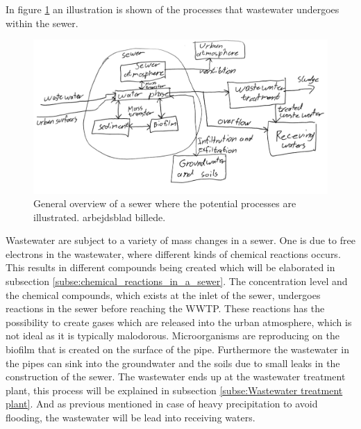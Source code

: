 
In figure \ref{fig:sewer_overview_of_the_chemical_process} an illustration is shown of the processes that wastewater undergoes within the sewer.
\begin{figure}[H]
\centering
\includegraphics[width=1\textwidth]{report/introduction/pictures/detailed_sewer.pdf}
\caption{General overview of a sewer where the potential processes are illustrated. arbejdsblad billede. }
\label{fig:sewer_overview_of_the_chemical_process}
\end{figure}

Wastewater are subject to a variety of mass changes in a sewer. One is due to free electrons in the wastewater, where different kinds of chemical reactions occurs. This results in different compounds being created which will be elaborated in subsection \ref{subse:chemical_reactions_in_a_sewer}. The concentration level and the chemical compounds, which exists at the inlet of the sewer, undergoes reactions in the sewer before reaching the WWTP. These reactions has the possibility to create gases which are released into the urban atmosphere, which is not ideal as it is typically malodorous. %
Microorganisms are reproducing on the biofilm that is created on the surface of the pipe. Furthermore the wastewater in the pipes can sink into the groundwater and the soils due to small leaks in the construction of the sewer. The wastewater ends up at the wastewater treatment plant, this process will be explained in subsection \ref{subse:Wastewater treatment plant}. And as previous mentioned in case of heavy precipitation to avoid flooding, the wastewater will be lead into receiving waters. 


